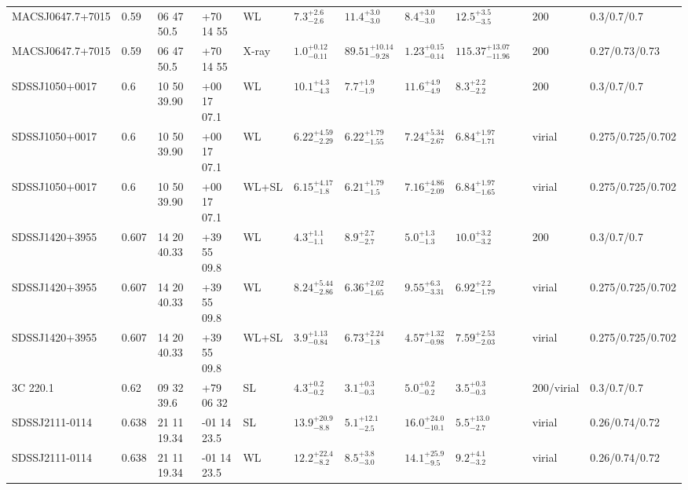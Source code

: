 \begin{landscape}
\begin{center}
{\begin{longtable}{llllllllllll}
MACSJ0647.7+7015 & 0.59 & 06 47 50.5 & +70 14 55 & WL & ${7.3}^{+2.6}_{-2.6}$ & ${11.4}^{+3.0}_{-3.0}$ & ${8.4}^{+3.0}_{-3.0}$ & ${12.5}^{+3.5}_{-3.5}$ & \citet{SE14.1} & 200 & 0.3/0.7/0.7 \\
MACSJ0647.7+7015 & 0.59 & 06 47 50.5 & +70 14 55 & X-ray & ${1.0}^{+0.12}_{-0.11}$ & ${89.51}^{+10.14}_{-9.28}$ & ${1.23}^{+0.15}_{-0.14}$ & ${115.37}^{+13.07}_{-11.96}$ & \citet{BA14.1} & 200 & 0.27/0.73/0.73 \\
SDSSJ1050+0017 & 0.6 & 10 50 39.90 & +00 17 07.1 & WL & ${10.1}^{+4.3}_{-4.3}$ & ${7.7}^{+1.9}_{-1.9}$ & ${11.6}^{+4.9}_{-4.9}$ & ${8.3}^{+2.2}_{-2.2}$ & \citet{SE14.1} & 200 & 0.3/0.7/0.7 \\
SDSSJ1050+0017 & 0.6 & 10 50 39.90 & +00 17 07.1 & WL & ${6.22}^{+4.59}_{-2.29}$ & ${6.22}^{+1.79}_{-1.55}$ & ${7.24}^{+5.34}_{-2.67}$ & ${6.84}^{+1.97}_{-1.71}$ & \citet{OG12.1} & virial & 0.275/0.725/0.702 \\
SDSSJ1050+0017 & 0.6 & 10 50 39.90 & +00 17 07.1 & WL+SL & ${6.15}^{+4.17}_{-1.8}$ & ${6.21}^{+1.79}_{-1.5}$ & ${7.16}^{+4.86}_{-2.09}$ & ${6.84}^{+1.97}_{-1.65}$ & \citet{OG12.1} & virial & 0.275/0.725/0.702 \\
SDSSJ1420+3955 & 0.607 & 14 20 40.33 & +39 55 09.8 & WL & ${4.3}^{+1.1}_{-1.1}$ & ${8.9}^{+2.7}_{-2.7}$ & ${5.0}^{+1.3}_{-1.3}$ & ${10.0}^{+3.2}_{-3.2}$ & \citet{SE14.1} & 200 & 0.3/0.7/0.7 \\
SDSSJ1420+3955 & 0.607 & 14 20 40.33 & +39 55 09.8 & WL & ${8.24}^{+5.44}_{-2.86}$ & ${6.36}^{+2.02}_{-1.65}$ & ${9.55}^{+6.3}_{-3.31}$ & ${6.92}^{+2.2}_{-1.79}$ & \citet{OG12.1} & virial & 0.275/0.725/0.702 \\
SDSSJ1420+3955 & 0.607 & 14 20 40.33 & +39 55 09.8 & WL+SL & ${3.9}^{+1.13}_{-0.84}$ & ${6.73}^{+2.24}_{-1.8}$ & ${4.57}^{+1.32}_{-0.98}$ & ${7.59}^{+2.53}_{-2.03}$ & \citet{OG12.1} & virial & 0.275/0.725/0.702 \\
3C 220.1 & 0.62 & 09 32 39.6 & +79 06 32 & SL & ${4.3}^{+0.2}_{-0.2}$ & ${3.1}^{+0.3}_{-0.3}$ & ${5.0}^{+0.2}_{-0.2}$ & ${3.5}^{+0.3}_{-0.3}$ & \citet{CO07.1} & 200/virial & 0.3/0.7/0.7 \\
SDSSJ2111-0114 & 0.638 & 21 11 19.34 & -01 14 23.5 & SL & ${13.9}^{+20.9}_{-8.8}$ & ${5.1}^{+12.1}_{-2.5}$ & ${16.0}^{+24.0}_{-10.1}$ & ${5.5}^{+13.0}_{-2.7}$ & \citet{OG09.1} & virial & 0.26/0.74/0.72 \\
SDSSJ2111-0114 & 0.638 & 21 11 19.34 & -01 14 23.5 & WL & ${12.2}^{+22.4}_{-8.2}$ & ${8.5}^{+3.8}_{-3.0}$ & ${14.1}^{+25.9}_{-9.5}$ & ${9.2}^{+4.1}_{-3.2}$ & \citet{OG09.1} & virial & 0.26/0.74/0.72 \\

\end{longtable}}
\end{center}
\end{landscape}
